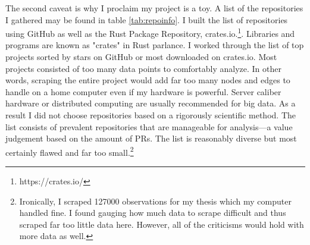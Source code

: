 \documentclass[12pt, a4paper]{article}
\begin{document}
The second caveat is why I proclaim my project is a toy. A list of the repositories I gathered may be found in table \ref{tab:repoinfo}. I built the list of repositories using GitHub as well as the Rust Package Repository, crates.io.\footnote{https://crates.io/}. Libraries and programs are known as "crates" in Rust parlance. I worked through the list of top projects sorted by stars on GitHub or most downloaded on crates.io. Most projects consisted of too many data points to comfortably analyze. In other words, scraping the entire project would add far too many nodes and edges to handle on a home computer even if my hardware is powerful. Server caliber hardware or distributed computing are usually recommended for big data. As a result I did not choose repositories based on a rigorously scientific method. The list consists of prevalent repositories that are manageable for analysis---a value judgement based on the amount of PRs. The list is reasonably diverse but most certainly flawed and far too small.\footnote{Ironically, I scraped 127000 observations for my thesis which my computer handled fine. I found gauging how much data to scrape difficult and thus scraped far too little data here. However, all of the criticisms would hold with more data as well.}
\end{document}
